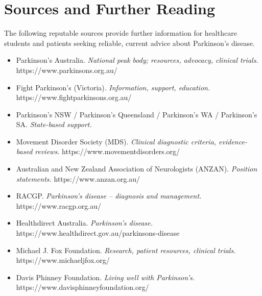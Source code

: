 \section*{Sources and Further Reading}
The following reputable sources provide further information for healthcare students and patients seeking reliable, current advice about Parkinson's disease.

\begin{itemize}
    \item Parkinson's Australia. \textit{National peak body; resources, advocacy, clinical trials.} https://www.parkinsons.org.au/
    \item Fight Parkinson's (Victoria). \textit{Information, support, education.} https://www.fightparkinsons.org.au/
    \item Parkinson's NSW / Parkinson's Queensland / Parkinson's WA / Parkinson's SA. \textit{State-based support.}
    \item Movement Disorder Society (MDS). \textit{Clinical diagnostic criteria, evidence-based reviews.} https://www.movementdisorders.org/
    \item Australian and New Zealand Association of Neurologists (ANZAN). \textit{Position statements.} https://www.anzan.org.au/
    \item RACGP. \textit{Parkinson's disease -- diagnosis and management.} https://www.racgp.org.au/
    \item Healthdirect Australia. \textit{Parkinson's disease.} https://www.healthdirect.gov.au/parkinsons-disease
    \item Michael J. Fox Foundation. \textit{Research, patient resources, clinical trials.} https://www.michaeljfox.org/
    \item Davis Phinney Foundation. \textit{Living well with Parkinson's.} https://www.davisphinneyfoundation.org/
\end{itemize}